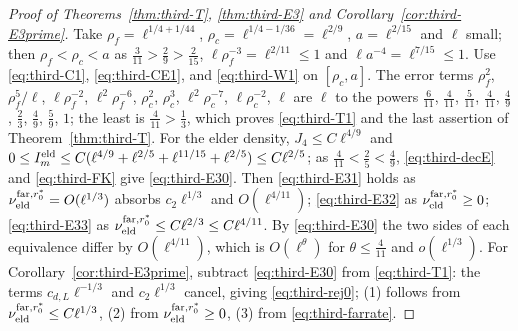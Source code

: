 \begin{proof}[Proof of Theorems~\ref{thm:third-T}, \ref{thm:third-E3} and Corollary~\ref{cor:third-E3prime}]
Take $\rho_f=\ell^{1/4+1/44}$, $\rho_c=\ell^{1/4-1/36}=\ell^{2/9}$, $a=\ell^{2/15}$ and $\ell$ small; then $\rho_f<\rho_c<a$ as $\frac3{11}>\frac29>\frac2{15}$, $\ell\rho_f^{-3}=\ell^{2/11}\le1$ and $\ell a^{-4}=\ell^{7/15}\le1$. Use \eqref{eq:third-C1}, \eqref{eq:third-CE1}, and \eqref{eq:third-W1} on $[\rho_c,a]$. The error terms $\rho_f^2$, $\rho_f^5/\ell$, $\ell\rho_f^{-2}$, $\ell^2\rho_f^{-6}$, $\rho_c^2$, $\rho_c^3$, $\ell^2\rho_c^{-7}$, $\ell\rho_c^{-2}$, $\ell$ are $\ell$ to the powers $\frac6{11}$, $\frac4{11}$, $\frac5{11}$, $\frac4{11}$, $\frac49$, $\frac23$, $\frac49$, $\frac59$, $1$; the least is $\frac4{11}>\frac13$, which proves \eqref{eq:third-T1} and the last assertion of Theorem~\ref{thm:third-T}. For the elder density, $J_4\le C\ell^{4/9}$ and $0\le I^{\mathrm{eld}}_m\le C(\ell^{4/9}+\ell^{2/5}+\ell^{11/15}+\ell^{2/5})\le C\ell^{2/5}$; as $\frac4{11}<\frac25<\frac49$, \eqref{eq:third-decE} and \eqref{eq:third-FK} give \eqref{eq:third-E30}. Then \eqref{eq:third-E31} holds as $\nu_{\mathrm{eld}}^{{\rm far},r_0^*}=O(\ell^{1/3})$ absorbs $c_2\ell^{1/3}$ and $O(\ell^{4/11})$; \eqref{eq:third-E32} as $\nu_{\mathrm{eld}}^{{\rm far},r_0^*}\ge0$; \eqref{eq:third-E33} as $\nu_{\mathrm{eld}}^{{\rm far},r_0^*}\le C\ell^{2/3}\le C\ell^{4/11}$. By \eqref{eq:third-E30} the two sides of each equivalence differ by $O(\ell^{4/11})$, which is $O(\ell^\theta)$ for $\theta\le\frac4{11}$ and $o(\ell^{1/3})$. For Corollary~\ref{cor:third-E3prime}, subtract \eqref{eq:third-E30} from \eqref{eq:third-T1}: the terms $c_{d,L}\ell^{-1/3}$ and $c_2\ell^{1/3}$ cancel, giving \eqref{eq:third-rej0}; (1) follows from $\nu_{\mathrm{eld}}^{{\rm far},r_0^*}\le C\ell^{1/3}$, (2) from $\nu_{\mathrm{eld}}^{{\rm far},r_0^*}\ge0$, (3) from \eqref{eq:third-farrate}.
\end{proof}

